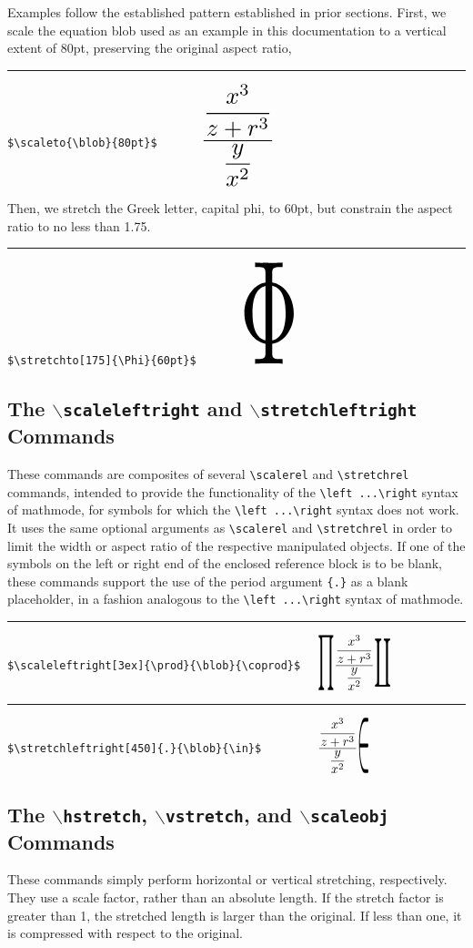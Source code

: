 \documentclass{article}
\newcommand\rl{\rule{2em}{0in}}
\let\vb\verb
\begin{document}
Examples follow the established pattern established in prior sections.
First, we scale the equation blob used as an example in this
documentation to a vertical extent of 80pt, preserving the original
aspect ratio,

\rl\vb|$\scaleto{\blob}{80pt}$      | $\scaleto{\blob}{80pt}$

Then, we stretch the Greek letter, capital phi, to 60pt, but constrain
the aspect ratio to no less than 1.75.

\rl\vb|$\stretchto[175]{\Phi}{60pt}$      | $\stretchto[175]{\Phi}{80pt}$

\subsection{The $\backslash$\texttt{scaleleftright} and
 $\backslash$\texttt{stretchleftright}\\Commands}

These commands are composites of several \vb|\scalerel| and
\vb|\stretchrel| commands, intended to provide the functionality of
the \vb|\left ...\right| syntax of mathmode, for symbols for which
the \vb|\left ...\right| syntax does not work.  It uses the same
optional arguments as \vb|\scalerel| and \vb|\stretchrel| in order
to limit the width or aspect ratio of the respective manipulated
objects.  If one of the symbols on the left or right end of the enclosed
reference block is to be blank, these commands support the use of the
period argument \vb|{.}| as a blank placeholder, in a fashion
analogous to the \vb|\left ...\right| syntax of mathmode.

\rl\vb|$\scaleleftright[3ex]{\prod}{\blob}{\coprod}$  |
$\scaleleftright[3ex]{\prod}{\blob}{\coprod}$

\rl\vb|$\stretchleftright[450]{.}{\blob}{\in}$        |
$\stretchleftright[450]{.}{\blob}{\in}$

\subsection{The $\backslash$\texttt{hstretch},
 $\backslash$\texttt{vstretch}, and $\backslash$\texttt{scaleobj}
 Commands}

These commands simply perform horizontal or vertical stretching,
respectively.  They use a scale factor, rather than an absolute length.
If the stretch factor is greater than 1, the stretched length is larger
than the original.  If less than one, it is compressed with respect to
the original.
\end{document}

